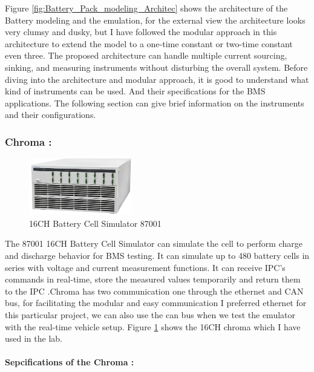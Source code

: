 Figure \ref{fig:Battery_Pack_modeling_Architec} shows the architecture of the Battery modeling and the emulation, for the external view the architecture looks very clumsy and dusky, but I have followed the modular approach in this architecture to extend the model to a one-time constant or two-time constant even three. The proposed architecture can handle multiple current sourcing, sinking, and measuring instruments without disturbing the overall system. Before diving into the architecture and modular approach, it is good to understand what kind of instruments can be used. And their specifications for the BMS applications. The following section can give brief information on the instruments and their configurations.

\subsubsection{Chroma :}
\begin{figure}[h]
	\centering
	\includegraphics[width=0.4\textwidth]{Chap06/Figures/Chroma.PNG}
	\caption{16CH Battery Cell Simulator 87001}
	\label{fig:Chroma}
\end{figure}
The 87001 16CH Battery Cell Simulator can simulate the cell to perform charge and discharge behavior for BMS testing. It can simulate up to 480 battery cells in series with voltage and current measurement functions. It can receive IPC's commands in real-time, store the measured values temporarily and return them to the IPC \cite{Chroma_UserManual}.Chroma has two communication one through the ethernet and CAN bus, for facilitating the modular and easy communication I preferred ethernet for this particular project, we can also use the can bus when we test the emulator with the real-time vehicle setup. Figure \ref{fig:Chroma} shows the 16CH chroma which I have used in the lab.

\paragraph{Sepcifications of the Chroma :}

